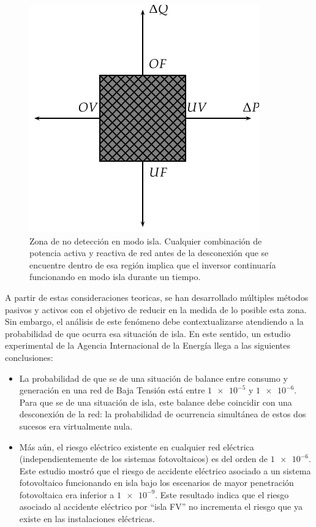 %
\begin{figure}


\includegraphics{../figs/NDZ}

\caption[Zona de no detección en modo isla.]{Zona de no detección en modo isla. Cualquier combinación de potencia
activa y reactiva de red antes de la desconexión que se encuentre
dentro de esa región implica que el inversor continuaría funcionando
en modo isla durante un tiempo. \label{fig:NDZ}}



\end{figure}


A partir de estas consideraciones teoricas, se han desarrollado múltiples
métodos pasivos y activos con el objetivo de reducir en la medida
de lo posible esta zona. Sin embargo, el análisis de este fenómeno
debe contextualizarse atendiendo a la probabilidad de que ocurra esa
situación de isla. En este sentido, un estudio experimental de la
Agencia Internacional de la Energía \cite{Verhoeven2002,Cullen.Thornycroft.ea2002}
llega a las siguientes conclusiones: 
\begin{itemize}
\item La probabilidad de que se de una situación de balance entre consumo
y generación en una red de Baja Tensión está entre $\num{1e-5}$ y
$\num{1e-6}$. Para que se de una situación de isla, este balance
debe coincidir con una desconexión de la red: la probabilidad de ocurrencia
simultánea de estos dos sucesos era virtualmente nula. 
\item Más aún, el riesgo eléctrico existente en cualquier red eléctrica
(independientemente de los sistemas fotovoltaicos) es del orden de
$\num{1e-6}$. Este estudio mostró que el riesgo de accidente eléctrico
asociado a un sistema fotovoltaico funcionando en isla bajo los escenarios
de mayor penetración fotovoltaica era inferior a $\num{1e-9}$. Este
resultado indica que el riesgo asociado al accidente eléctrico por
\textquotedblleft{}isla FV\textquotedblright{} no incrementa el riesgo
que ya existe en las instalaciones eléctricas. 
\end{itemize}

